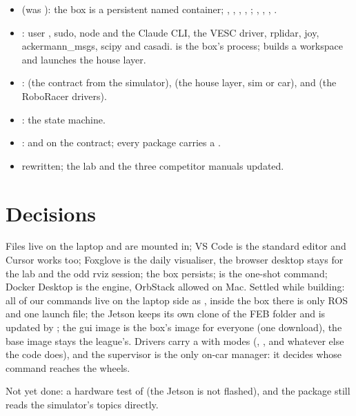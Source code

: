 \documentclass[11pt,a4paper]{article}
\begin{document}
\begin{itemize}
  \item {} (was ): the box is a persistent named container; , , , , ; , , , .
  \item {}: user , sudo, node and the Claude CLI, the VESC driver, rplidar, joy, ackermann\_msgs, scipy and casadi.  is the box's process;  builds a workspace and launches the house layer.
  \item {}:  (the contract from the simulator),  (the house layer, sim or car),  and  (the RoboRacer drivers).
  \item {}: the state machine.
  \item {}:  and  on the contract; every package carries a .
  \item {} rewritten; the lab and the three competitor manuals updated.
\end{itemize}

\section{Decisions}

Files live on the laptop and are mounted in; VS Code is the standard editor and Cursor works too;
Foxglove is the daily visualiser, the browser desktop stays for the lab and the odd rviz session;
the box persists;  is the one-shot command; Docker Desktop is the engine, OrbStack
allowed on Mac. Settled while building: all of our commands live on the laptop side as ,
inside the box there is only ROS and one launch file; the Jetson keeps its own clone of the FEB
folder and is updated by ; the gui image is the box's image for everyone (one
download), the base image stays the league's. Drivers carry a  with modes
(, , and whatever else the code does), and the supervisor is the
only on-car manager: it decides whose command reaches the wheels.

Not yet done: a hardware test of  (the Jetson is not flashed), and the
 package still reads the simulator's topics directly.
\end{document}
